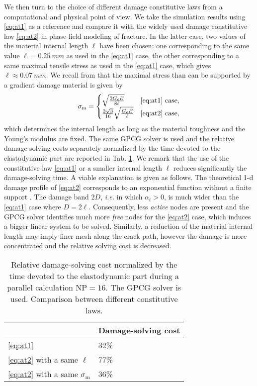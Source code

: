 We then turn to the choice of different damage constitutive laws from a computational and physical point of view. We take the simulation results using \eqref{eq:at1} as a reference and compare it with the widely used damage constitutive law \eqref{eq:at2} in phase-field modeling of fracture. In the latter case, two values of the material internal length $\ell$ have been chosen: one corresponding to the same value $\ell=\SI{0.25}{mm}$ as used in the \eqref{eq:at1} case, the other corresponding to a same maximal tensile stress as used in the \eqref{eq:at1} case, which gives $\ell\approx\SI{0.07}{mm}$. We recall from \cite{PhamAmorMarigoMaurini:2011} that the maximal stress than can be supported by a gradient damage material is given by
\begin{equation} \label{eq:sigm}
\sigma_\mathrm{m}=\begin{cases}
\sqrt{\frac{3G_\mathrm{c} E}{8\ell}} & \text{\eqref{eq:at1} case}, \\
\frac{3\sqrt{3}}{16}\sqrt{\frac{G_\mathrm{c} E}{\ell}} & \text{\eqref{eq:at2} case},
\end{cases}
\end{equation}
which determines the internal length as long as the material toughness and the Young's modulus are fixed. The same GPCG solver is used and the relative damage-solving costs separately normalized by the time devoted to the elastodynamic part are reported in Tab. \ref{tab:at1_vs_at2}. We remark that the use of the constitutive law \eqref{eq:at1} or a smaller internal length $\ell$ reduces significantly the damage-solving time. A viable explanation is given as follows. The theoretical 1-d damage profile of \eqref{eq:at2} corresponds to an exponential function without a finite support \cite{BourdinFrancfortMarigo:2008,MieheHofackerWelschinger:2010}. The damage band $2D$, \emph{i.e.} in which $\alpha_t>0$, is much wider than the \eqref{eq:at1} case where $D=2\ell$. Consequently, less \emph{active} nodes are present and the GPCG solver identifies much more \emph{free} nodes for the \eqref{eq:at2} case, which induces a bigger linear system to be solved. Similarly, a reduction of the material internal length may imply finer mesh along the crack path, however the damage is more concentrated and the relative solving cost is decreased.
\begin{table}[htbp]
\centering
\caption{Relative damage-solving cost normalized by the time devoted to the elastodynamic part during a parallel calculation $\mathrm{NP}=16$. The GPCG solver is used. Comparison between different constitutive laws.} \label{tab:at1_vs_at2}
\begin{tabular}{ll} \toprule
& Damage-solving cost  \\ \midrule
\eqref{eq:at1} & 32\% \\
\eqref{eq:at2} with a same $\ell$ & 77\% \\
\eqref{eq:at2} with a same $\sigma_\mathrm{m}$ & 36\% \\ \bottomrule
\end{tabular}
\end{table}

